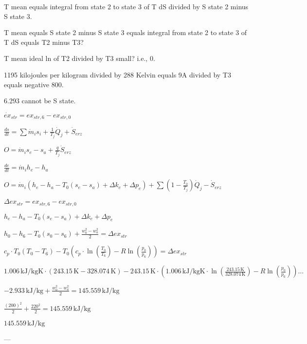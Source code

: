 T mean equals integral from state 2 to state 3 of T dS divided by S state 2 minus S state 3.  

T mean equals S state 2 minus S state 3 equals integral from state 2 to state 3 of T dS equals T2 minus T3?  

T mean ideal ln of T2 divided by T3 small? i.e., 0.  

1195 kilojoules per kilogram divided by 288 Kelvin equals 9A divided by T3 equals negative 800.  

6.293 cannot be S state.

\( \dot{ex}_{str} = ex_{str,6} - ex_{str,0} \)  

\( \frac{ds}{dt} = \sum \dot{m}_i s_i + \frac{1}{T_j} \dot{Q}_j + \dot{S}_{erz} \)  

\( O = \dot{m}_{i} s_{e} - s_{a} + \frac{q}{T_j} \dot{S}_{erz} \)  

\( \frac{de}{dt} = \dot{m}_{i} h_{e} - h_{a} \)  

\( O = \dot{m}_{i} (h_{e} - h_{a} - T_0 (s_{e} - s_{a}) + \Delta k_e + \Delta p_e) + \sum (1 - \frac{T_0}{T_j}) \dot{Q}_j - \dot{S}_{erz} \)  

\( \Delta ex_{str} = ex_{str,6} - ex_{str,0} \)  

\( h_{e} - h_{a} - T_0 (s_{e} - s_{a}) + \Delta k_e + \Delta p_e \)  

\( h_{0} - h_{6} - T_0 (s_{0} - s_{6}) + \frac{w_{0}^2 - w_{a}^2}{2} = \Delta ex_{str} \)  

\( c_p \cdot T_0 (T_0 - T_6) - T_0 (c_p \cdot \ln (\frac{T_0}{T_6}) - R \ln (\frac{p_0}{p_6})) = \Delta ex_{str} \)  

\( 1.006 \, \text{kJ/kgK} \cdot (243.15 \, \text{K} - 328.074 \, \text{K}) - 243.15 \, \text{K} \cdot (1.006 \, \text{kJ/kgK} \cdot \ln (\frac{243.15 \, \text{K}}{328.074 \, \text{K}}) - R \ln (\frac{p_0}{p_6})) \dots \)  

\( -2.933 \, \text{kJ/kg} + \frac{w_{0}^2 - w_{a}^2}{2} = 145.559 \, \text{kJ/kg} \)  

\( \frac{(200)^2}{2} + \frac{220^2}{2} = 145.559 \, \text{kJ/kg} \)  

\( 145.559 \, \text{kJ/kg} \)  

---